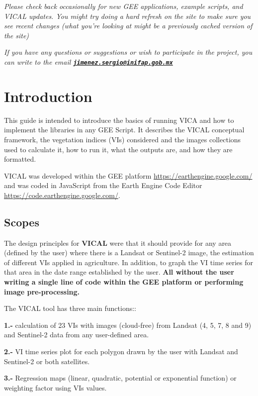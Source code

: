 \documentclass[
]{book}
\begin{document}
\emph{Please check back occasionally for new GEE applications, example scripts, and VICAL updates. You might try doing a hard refresh on the site to make sure you see recent changes (what you're looking at might be a previously cached version of the site)}

\emph{If you have any questions or suggestions or wish to participate in the project, you can write to the email \textbf{\href{mailto:jimenez.sergio@inifap.gob.mx}{\nolinkurl{jimenez.sergio@inifap.gob.mx}}}}

\hypertarget{intro}{%
\chapter{Introduction}\label{intro}}

This guide is intended to introduce the basics of running VICA and how to implement the libraries in any GEE Script. It describes the VICAL conceptual framework, the vegetation indices (VIs) considered and the images collections used to calculate it, how to run it, what the outputs are, and how they are formatted.

VICAL was developed within the GEE platform \url{https://earthengine.google.com/} and was coded in JavaScript from the Earth Engine Code Editor \url{https://code.earthengine.google.com/}.

\hypertarget{scopes}{%
\section{Scopes}\label{scopes}}

The design principles for \textbf{VICAL} were that it should provide for any area (defined by the user) where there is a Landsat or Sentinel-2 image, the estimation of different VIs applied in agriculture. In addition, to graph the VI time series for that area in the date range established by the user. \textbf{All without the user writing a single line of code within the GEE platform or performing image pre-processing.}

The VICAL tool has three main functions::

\textbf{1.-} calculation of 23 VIs with images (cloud-free) from Landsat (4, 5, 7, 8 and 9) and Sentinel-2 data from any user-defined area.

\textbf{2.-} VI time series plot for each polygon drawn by the user with Landsat and Sentinel-2 or both satellites.

\textbf{3.-} Regression maps (linear, quadratic, potential or exponential function) or weighting factor using VIs values.
\end{document}
